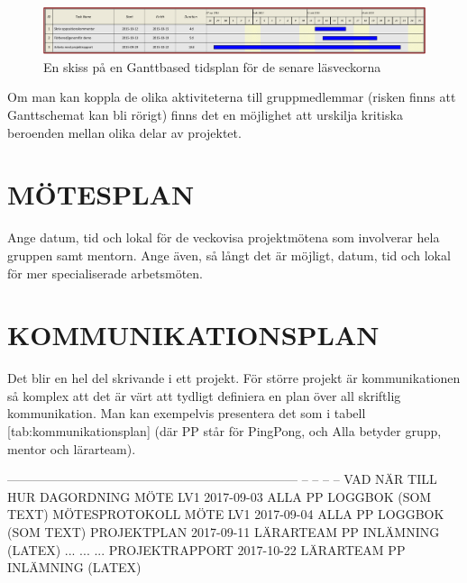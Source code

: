 \documentclass[a4paper]{article}
\begin{document}
\begin{figure}[h]
    \includegraphics[width=1\textwidth]{figurer/tidsplan.pdf}
    \caption{En skiss på en Ganttbased tidsplan för de senare läsveckorna}
    \label{fig:Gantt}
\end{figure}

Om man kan koppla de olika aktiviteterna till gruppmedlemmar (risken
finns att Ganttschemat kan bli rörigt) finns det en möjlighet att
urskilja kritiska beroenden mellan olika delar av projektet.



\section{MÖTESPLAN}
\label{sec:mötesplan}


Ange datum, tid och lokal för de veckovisa projektmötena som involverar
hela gruppen samt mentorn. Ange även, så långt det är möjligt, datum,
tid och lokal för mer specialiserade arbetsmöten.



\section{KOMMUNIKATIONSPLAN}
\label{sec:komm}


Det blir en hel del skrivande i ett projekt. För större projekt är
kommunikationen så komplex att det är värt att tydligt definiera en plan
över all skriftlig kommunikation. Man kan exempelvis presentera det som
i tabell [tab:kommunikationsplan] (där PP står för PingPong, och Alla
betyder grupp, mentor och lärarteam).

  --------------------------------------------------------------------- -- -- -- --
  VAD  NÄR  TILL  HUR                                                         
  DAGORDNING MÖTE LV1  2017-09-03  ALLA  PP LOGGBOK (SOM TEXT)                
  MÖTESPROTOKOLL MÖTE LV1  2017-09-04  ALLA  PP LOGGBOK (SOM TEXT)            
  PROJEKTPLAN  2017-09-11  LÄRARTEAM  PP INLÄMNING (LATEX)                    
  ...  ...  ...                                                               
  PROJEKTRAPPORT  2017-10-22  LÄRARTEAM  PP INLÄMNING (LATEX)                 
                                                                                 
\end{document}
